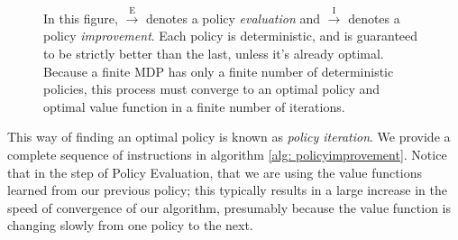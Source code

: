 \documentclass[12pt]{article}
\begin{document}
\begin{figure}[h]
  \centering
  \caption{\footnotesize In this figure, $\overset{\textrm{E}}{\longrightarrow}$ denotes a policy \emph{evaluation} and $\overset{\textrm{I}}{\longrightarrow}$ denotes a policy \emph{improvement}. Each policy is deterministic, and is guaranteed to be strictly better than the last, unless it's already optimal. Because a finite MDP has only a finite number of deterministic policies, this process must converge to an optimal policy and optimal value function in a finite number of iterations.}
\end{figure}

This way of finding an optimal policy is known as \emph{policy iteration}. We provide a complete sequence of instructions in algorithm \ref{alg: policyimprovement}.
Notice that in the step of Policy Evaluation, that we are using the value functions learned from our previous policy; this typically results in a large increase in the speed of convergence of our algorithm, presumably because the value function is changing slowly from one policy to the next.
\end{document}
